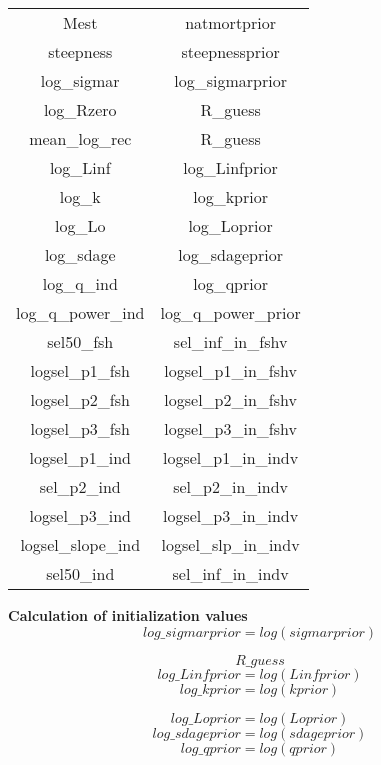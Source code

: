 \documentclass{article}
\begin{document}
\begin{tabular}{c c}
    Mest & natmortprior \\
     steepness & steepnessprior\\
     log\_sigmar & log\_sigmarprior \\
     log\_Rzero &    R\_guess\\
     mean\_log\_rec 
 & R\_guess\\
 log\_Linf  &  log\_Linfprior\\
  log\_k &       log\_kprior\\
  log\_Lo &      log\_Loprior\\
  log\_sdage &  log\_sdageprior\\
   log\_q\_ind & log\_qprior\\ 
  log\_q\_power\_ind & log\_q\_power\_prior\\
  sel50\_fsh & sel\_inf\_in\_fshv\\
  logsel\_p1\_fsh &   logsel\_p1\_in\_fshv \\
  logsel\_p2\_fsh &   logsel\_p2\_in\_fshv\\
  logsel\_p3\_fsh &  logsel\_p3\_in\_fshv \\
  logsel\_p1\_ind &   logsel\_p1\_in\_indv \\
  sel\_p2\_ind  &       sel\_p2\_in\_indv \\
  logsel\_p3\_ind &   logsel\_p3\_in\_indv\\
  logsel\_slope\_ind & logsel\_slp\_in\_indv \\
  sel50\_ind & sel\_inf\_in\_indv 
\end{tabular}


\textbf{Calculation of initialization values}\\
\begin{equation}
log\_sigmarprior = log(sigmarprior)
\end{equation}

\begin{equation} R\_guess
\end{equation}
\begin{equation}
log\_Linfprior = log(Linfprior)
\end{equation}
\begin{equation}
    log\_kprior = log(kprior)
\end{equation}

\begin{equation}
    log\_Loprior = log(Loprior)
\end{equation}
\begin{equation}
    log\_sdageprior = log(sdageprior)
\end{equation}
\begin{equation}
    log\_qprior = log(qprior)
\end{equation}
\end{document}
